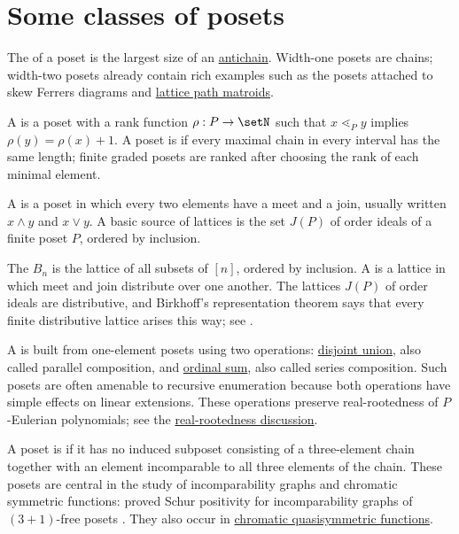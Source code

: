 \section[posetClasses]{Some classes of posets}

The \label{posetWidth} of a poset is the largest size of an
\hyperref[antichain]{antichain}.  Width-one posets are chains; width-two
posets already contain rich examples such as the posets attached to skew
Ferrers diagrams and \hyperref[latticePathMatroids]{lattice path matroids}.

A \label{rankedPoset} is a poset with a rank function
\(\rho:P\to\setN\) such that \(x\lessdot_P y\) implies
\(\rho(y)=\rho(x)+1\).  A poset is
\label{gradedPoset} if every maximal chain in every interval has
the same length; finite graded posets are ranked after choosing the rank of
each minimal element.

A \label{latticePoset} is a poset in which every two elements
have a meet and a join, usually written $x\wedge y$ and $x\vee y$.  A basic
source of lattices is the set $J(P)$ of order ideals of a finite poset $P$,
ordered by inclusion.

The \label{booleanLattice} \(B_n\) is the lattice of
all subsets of \([n]\), ordered by inclusion.  A
\label{distributiveLattice} is a lattice in which
meet and join distribute over one another.  The lattices \(J(P)\) of order
ideals are distributive, and Birkhoff's representation theorem says that
every finite distributive lattice arises this way; see \cite{StanleyEC1}.

A \label{seriesParallelPoset} is built from
one-element posets using two operations:
\hyperref[disjointUnionPoset]{disjoint union}, also called parallel
composition, and \hyperref[ordinalSumPoset]{ordinal sum}, also called series
composition.  Such posets are often amenable to recursive enumeration because
both operations have simple effects on linear extensions.  These operations
preserve real-rootedness of $P$-Eulerian polynomials; see the
\hyperref[posetRealRooted]{real-rootedness discussion}.

A poset is \label{threePlusOneFreePoset} if it has no
induced subposet consisting of a three-element chain together with an element
incomparable to all three elements of the chain.  These posets are central in
the study of incomparability graphs and chromatic symmetric functions:
 proved Schur positivity for incomparability graphs
of $(3+1)$-free posets \cite{Gasharov1996}.  They also occur in
\hyperref[chromaticQuasisymmetric]{chromatic quasisymmetric functions}.

